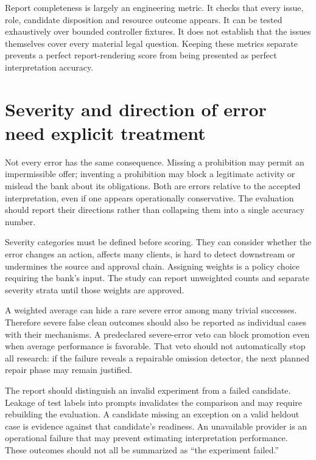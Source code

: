 Report completeness is largely an engineering metric. It checks that every issue,
role, candidate disposition and resource outcome appears. It can be tested
exhaustively over bounded controller fixtures. It does not establish that the
issues themselves cover every material legal question. Keeping these metrics
separate prevents a perfect report-rendering score from being presented as
perfect interpretation accuracy.

\section{Severity and direction of error need explicit treatment}
\label{merge:M09:06}


Not every error has the same consequence. Missing a prohibition may permit an
impermissible offer; inventing a prohibition may block a legitimate activity or
mislead the bank about its obligations. Both are errors relative to the accepted
interpretation, even if one appears operationally conservative. The evaluation
should report their directions rather than collapsing them into a single accuracy
number.

Severity categories must be defined before scoring. They can consider whether the
error changes an action, affects many clients, is hard to detect downstream or
undermines the source and approval chain. Assigning weights is a policy choice
requiring the bank's input. The study can report unweighted counts and separate
severity strata until those weights are approved.


A weighted average can hide a rare severe error among many trivial successes.
Therefore severe false clean outcomes should also be reported as individual cases
with their mechanisms. A predeclared severe-error veto can block promotion even
when average performance is favorable. That veto should not automatically stop
all research: if the failure reveals a repairable omission detector, the next
planned repair phase may remain justified.

The report should distinguish an invalid experiment from a failed candidate.
Leakage of test labels into prompts invalidates the comparison and may require
rebuilding the evaluation. A candidate missing an exception on a valid heldout
case is evidence against that candidate's readiness. An unavailable provider is
an operational failure that may prevent estimating interpretation performance.
These outcomes should not all be summarized as ``the experiment failed.''

